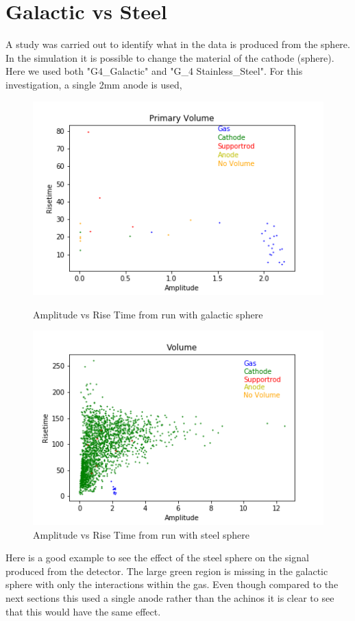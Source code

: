 \documentclass[a4paper]{article}
\begin{document}
\section{Galactic vs Steel}
A study was carried out to identify what in the data is produced from the sphere. In the simulation it is possible to change the material of the cathode (sphere). Here we used both "G4\_Galactic" and "G\_4 Stainless\_Steel". For this investigation, a single 2mm anode is used,
\begin{figure}[H]
    \centering
    \begin{minipage}{.5\textwidth}
        \centering
        \includegraphics[width=1\linewidth]{GalacvSteel/galac.png}
        \caption{Amplitude vs Rise Time from run with galactic sphere}
        \label{fig:prob1_6_2}
    \end{minipage}%
    \begin{minipage}{0.5\textwidth}
        \centering
        \includegraphics[width=1\linewidth]{GalacvSteel/steel.png}
        \caption{Amplitude vs Rise Time from run with steel sphere}
        \label{fig:prob1_6_1}
    \end{minipage}
\end{figure}
\noindent Here is a good example to see the effect of the steel sphere on the signal produced from the detector. The large green region is missing in the galactic sphere with only the interactions within the gas. Even though compared to the next sections this used a single anode rather than the achinos it is clear to see that this would have the same effect. 
\end{document}
